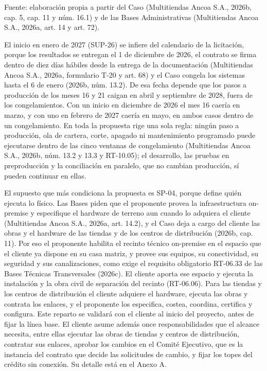 \documentclass[11pt]{article}
\begin{document}
Fuente: elaboración propia a partir del Caso (Multitiendas Ancoa S.A., 2026b, cap. 5, cap. 11 y núm. 16.1) y de las Bases Administrativas (Multitiendas Ancoa S.A., 2026a, art. 14 y art. 72).

El inicio en enero de 2027 (SUP-26) se infiere del calendario de la licitación, porque los resultados se entregan el 1 de diciembre de 2026, el contrato se firma dentro de diez días hábiles desde la entrega de la documentación (Multitiendas Ancoa S.A., 2026a, formulario T-20 y art. 68) y el Caso congela los sistemas hasta el 6 de enero (2026b, núm. 13.2). De esa fecha depende que los pasos a producción de los meses 16 y 21 caigan en abril y septiembre de 2028, fuera de los congelamientos. Con un inicio en diciembre de 2026 el mes 16 caería en marzo, y con uno en febrero de 2027 caería en mayo, en ambos casos dentro de un congelamiento. En toda la propuesta rige una sola regla: ningún paso a producción, ola de cartera, corte, apagado ni mantenimiento programado puede ejecutarse dentro de las cinco ventanas de congelamiento (Multitiendas Ancoa S.A., 2026b, núm. 13.2 y 13.3 y RT-10.05); el desarrollo, las pruebas en preproducción y la conciliación en paralelo, que no cambian producción, sí pueden continuar en ellas.

El supuesto que más condiciona la propuesta es SP-04, porque define quién ejecuta lo físico. Las Bases piden que el proponente provea la infraestructura on-premise y especifique el hardware de terreno aun cuando lo adquiera el cliente (Multitiendas Ancoa S.A., 2026a, art. 14.2), y el Caso deja a cargo del cliente las obras y el hardware de las tiendas y de los centros de distribución (2026b, cap. 11). Por eso el proponente habilita el recinto técnico on-premise en el espacio que el cliente ya dispone en su casa matriz, y provee sus equipos, su conectividad, su seguridad y sus canalizaciones, como exige el requisito obligatorio RT-06.33 de las Bases Técnicas Transversales (2026c). El cliente aporta ese espacio y ejecuta la instalación y la obra civil de separación del recinto (RT-06.06). Para las tiendas y los centros de distribución el cliente adquiere el hardware, ejecuta las obras y contrata los enlaces, y el proponente los especifica, costea, coordina, certifica y configura. Este reparto se validará con el cliente al inicio del proyecto, antes de fijar la línea base. El cliente asume además once responsabilidades que el alcance necesita, entre ellas ejecutar las obras de tiendas y centros de distribución, contratar sus enlaces, aprobar los cambios en el Comité Ejecutivo, que es la instancia del contrato que decide las solicitudes de cambio, y fijar los topes del crédito sin conexión. Su detalle está en el Anexo A.
\end{document}
